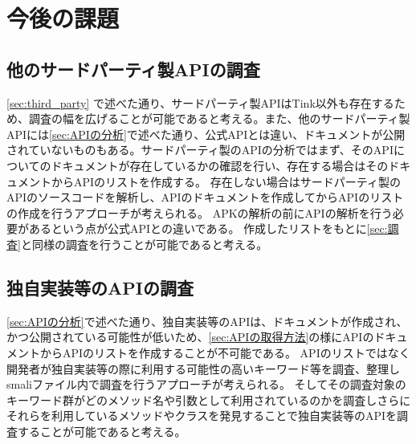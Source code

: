 \newpage
\section{今後の課題}
\subsection{他のサードパーティ製APIの調査}
\ref{sec:third_party}	で述べた通り、サードパーティ製APIはTink以外も存在するため、調査の幅を広げることが可能であると考える。また、他のサードパーティ製APIには\ref{sec:APIの分析}で述べた通り、公式APIとは違い、ドキュメントが公開されていないものもある。サードパーティ製のAPIの分析ではまず、そのAPIについてのドキュメントが存在しているかの確認を行い、存在する場合はそのドキュメントからAPIのリストを作成する。
存在しない場合はサードパーティ製のAPIのソースコードを解析し、APIのドキュメントを作成してからAPIのリストの作成を行うアプローチが考えられる。
APKの解析の前にAPIの解析を行う必要があるという点が公式APIとの違いである。
作成したリストをもとに\ref{sec:調査}と同様の調査を行うことが可能であると考える。
\subsection{独自実装等のAPIの調査}
\ref{sec:APIの分析}で述べた通り、独自実装等のAPIは、ドキュメントが作成され、かつ公開されている可能性が低いため、\ref{sec:APIの取得方法}の様にAPIのドキュメントからAPIのリストを作成することが不可能である。
APIのリストではなく開発者が独自実装等の際に利用する可能性の高いキーワード等を調査、整理しsmaliファイル内で調査を行うアプローチが考えられる。
そしてその調査対象のキーワード群がどのメソッド名や引数として利用されているのかを調査しさらにそれらを利用しているメソッドやクラスを発見することで独自実装等のAPIを調査することが可能であると考える。
